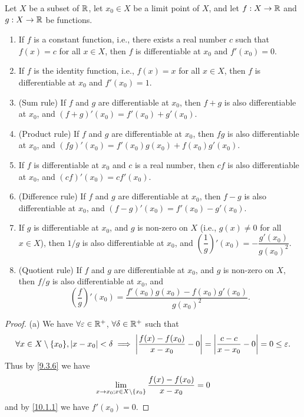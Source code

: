 \begin{thm}\label{10.1.13}
  Let \(X\) be a subset of \(\mathbb{R}\), let \(x_0 \in X\) be a limit point of \(X\), and let \(f : X \to \mathbb{R}\) and \(g : X \to \mathbb{R}\) be functions.
  \begin{enumerate}
    \item If \(f\) is a constant function, i.e., there exists a real number \(c\) such that \(f(x) = c\) for all \(x \in X\), then \(f\) is differentiable at \(x_0\) and \(f'(x_0) = 0\).
    \item If \(f\) is the identity function, i.e., \(f(x) = x\) for all \(x \in X\), then \(f\) is differentiable at \(x_0\) and \(f'(x_0) = 1\).
    \item (Sum rule)
          If \(f\) and \(g\) are differentiable at \(x_0\), then \(f + g\) is also differentiable at \(x_0\), and \((f + g)'(x_0) = f'(x_0) + g'(x_0)\).
    \item (Product rule)
          If \(f\) and \(g\) are differentiable at \(x_0\), then \(fg\) is also differentiable at \(x_0\), and \((fg)'(x_0) = f'(x_0)g(x_0) + f(x_0)g'(x_0)\).
    \item If \(f\) is differentiable at \(x_0\) and \(c\) is a real number, then \(cf\) is also differentiable at \(x_0\), and \((cf)'(x_0) = cf'(x_0)\).
    \item (Difference rule)
          If \(f\) and \(g\) are differentiable at \(x_0\), then \(f - g\) is also differentiable at \(x_0\), and \((f - g)'(x_0) = f'(x_0) - g'(x_0)\).
    \item If \(g\) is differentiable at \(x_0\), and \(g\) is non-zero on \(X\) (i.e., \(g(x) \neq 0\) for all \(x \in X\)), then \(1 / g\) is also differentiable at \(x_0\), and \((\dfrac{1}{g})'(x_0) = -\dfrac{g'(x_0)}{g(x_0)^2}\).
    \item (Quotient rule)
          If \(f\) and \(g\) are differentiable at \(x_0\), and \(g\) is non-zero on \(X\), then \(f / g\) is also differentiable at \(x_0\), and
          \[
            (\dfrac{f}{g})'(x_0) = \dfrac{f'(x_0) g(x_0) - f(x_0) g'(x_0)}{g(x_0)^2}.
          \]
  \end{enumerate}
\end{thm}

\begin{proof}{(a)}
  We have \(\forall \varepsilon \in \mathbb{R}^+\), \(\forall \delta \in \mathbb{R}^+\) such that
  \[
    \forall x \in X \setminus \set{x_0}, \abs{x - x_0} < \delta \implies \abs{\dfrac{f(x) - f(x_0)}{x - x_0} - 0} = \abs{\dfrac{c - c}{x - x_0} - 0} = 0 \leq \varepsilon.
  \]
  Thus by \cref{9.3.6} we have
  \[
    \lim_{x \to x_0 ; x \in X \setminus \left\lbrace x_0\right\rbrace} \dfrac{f(x) - f(x_0)}{x - x_0} = 0
  \]
  and by \cref{10.1.1} we have \(f'(x_0) = 0\).
\end{proof}

